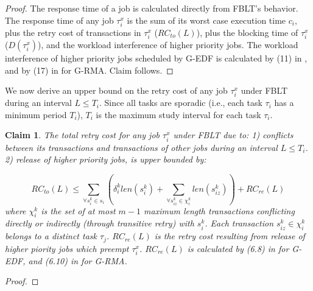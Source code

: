 \documentclass[prodmode,acmtecs]{acmsmall}
\newtheorem{clm}{Claim}
\begin{document}
\begin{compactenum}
\begin{proof}
The response time of a job is calculated directly from FBLT's behavior. The response time of any job $\tau_{i}^{x}$ is the sum of its
worst case execution time $c_{i}$, plus the retry cost of transactions
in $\tau_{i}^{x}$ ($RC_{to}(L)$), plus the blocking time of $\tau_{i}^{x}$
($D(\tau_{i}^{x})$), and the workload interference of higher priority
jobs. The workload interference of higher priority jobs scheduled by
G-EDF is calculated by (11) in \cite{stmconcurrencycontrol:emsoft11},
and by (17) in \cite{stmconcurrencycontrol:emsoft11} for G-RMA. Claim follows.
\end{proof}


We now derive an upper bound on the retry cost of any job $\tau_{i}^{x}$
under FBLT during an interval $L\le T_{i}$. Since all tasks are sporadic
(i.e., each task $\tau_{i}$ has a minimum period $T_{i}$), $T_{i}$
is the maximum study interval for each task $\tau_{i}$.

\begin{clm}

The total retry cost for any job $\tau_{i}^{x}$ under FBLT due to: 1) conflicts
between its transactions and transactions of other jobs during an interval $L\le T_{i}$. 2) release of higher priority jobs, is upper bounded by:

\begin{equation}
RC_{to}(L)\le\sum_{\forall s_{i}^{k}\in s_{i}}\left(\delta_{i}^{k}len(s_{i}^{k})+\sum_{\forall s_{iz}^k\in \chi_i^k} len(s_{iz}^{k})\right)+RC_{re}(L)\label{eq:fblt_rc}
\end{equation} 
where $\chi_i^k$ is the set of at most $m-1$ maximum length transactions conflicting directly or indirectly (through transitive retry) with $s_i^k$. Each transaction $s_{iz}^k \in \chi_i^k$ belongs to a distinct task $\tau_j$. $RC_{re}(L)$ is the retry cost resulting
from release of higher piority jobs which preempt $\tau_{i}^{x}$.
$RC_{re}(L)$ is calculated by (6.8) in \cite{shambake_phd_proposal}
for G-EDF, and (6.10) in \cite{shambake_phd_proposal} for G-RMA.

\end{clm}

\begin{proof}


\end{proof}
\end{compactenum}
\end{document}
